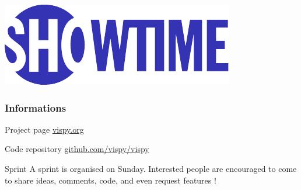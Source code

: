 \documentclass[10pt]{beamer}
\begin{document}
\begin{frame}[T]
  \begin{center}
    \includegraphics[width=.65\textwidth]{Showtime.pdf}
  \end{center}
\end{frame}

\begin{frame}
  \frametitle{Informations}

  \begin{block}{Project page}
    \url{vispy.org}
  \end{block}

  \begin{block}{Code repository}
    \url{github.com/vispy/vispy}
  \end{block}



  \begin{block}{Sprint}
    A sprint is organised on Sunday. Interested people are encouraged to come
    to share ideas, comments, code, and even request features !
  \end{block}

\end{frame}
\end{document}
